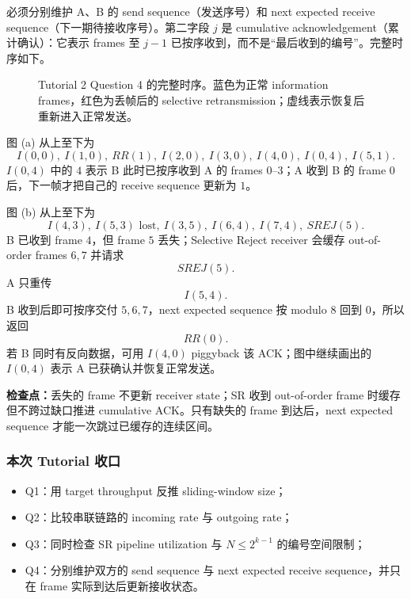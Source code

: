 \begin{checkedsolution}
必须分别维护 A、B 的 send sequence（发送序号）和 next expected receive sequence（下一期待接收序号）。第二字段 $j$ 是 cumulative acknowledgement（累计确认）：它表示 frames 至 $j-1$ 已按序收到，而不是“最后收到的编号”。完整时序如下。

\begin{figure}[htbp]
  \centering
  \resizebox{0.98\textwidth}{!}{}
  \caption{Tutorial 2 Question 4 的完整时序。蓝色为正常 information frames，红色为丢帧后的 selective retransmission；虚线表示恢复后重新进入正常发送。}
  \label{fig:sc2008-tut02-duplex-arq}
\end{figure}

图 (a) 从上至下为
\[
  \boxed{I(0,0),\ I(1,0),\ RR(1),\ I(2,0),\ I(3,0),\
  I(4,0),\ I(0,4),\ I(5,1)}.
\]
$I(0,4)$ 中的 $4$ 表示 B 此时已按序收到 A 的 frames $0$--$3$；A 收到 B 的 frame $0$ 后，下一帧才把自己的 receive sequence 更新为 $1$。

图 (b) 从上至下为
\[
  \boxed{I(4,3),\ I(5,3)\text{ lost},\ I(3,5),\
  I(6,4),\ I(7,4),\ SREJ(5)}.
\]
B 已收到 frame $4$，但 frame $5$ 丢失；Selective Reject receiver 会缓存 out-of-order frames $6,7$ 并请求
\[
  SREJ(5).
\]
A 只重传
\[
  \boxed{I(5,4)}.
\]
B 收到后即可按序交付 $5,6,7$，next expected sequence 按 modulo $8$ 回到 $0$，所以返回
\[
  \boxed{RR(0)}.
\]
若 B 同时有反向数据，可用 $I(4,0)$ piggyback 该 ACK；图中继续画出的 $I(0,4)$ 表示 A 已获确认并恢复正常发送。
\end{checkedsolution}

\textbf{检查点：}丢失的 frame 不更新 receiver state；SR 收到 out-of-order frame 时缓存但不跨过缺口推进 cumulative ACK。只有缺失的 frame 到达后，next expected sequence 才能一次跳过已缓存的连续区间。

\subsubsection*{本次 Tutorial 收口}

\begin{itemize}
  \item Q1：用 target throughput 反推 sliding-window size；
  \item Q2：比较串联链路的 incoming rate 与 outgoing rate；
  \item Q3：同时检查 SR pipeline utilization 与 $N\le2^{k-1}$ 的编号空间限制；
  \item Q4：分别维护双方的 send sequence 与 next expected receive sequence，并只在 frame 实际到达后更新接收状态。
\end{itemize}
